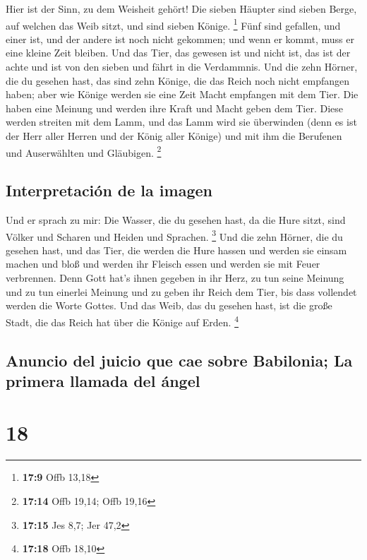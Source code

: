  Hier ist der Sinn, zu dem Weisheit gehört! Die sieben
Häupter sind sieben Berge, auf welchen das Weib sitzt, und sind sieben
Könige. \footnote{\textbf{17:9} Offb 13,18}  Fünf sind
gefallen, und einer ist, und der andere ist noch nicht gekommen; und
wenn er kommt, muss er eine kleine Zeit bleiben.  Und das
Tier, das gewesen ist und nicht ist, das ist der achte und ist von den
sieben und fährt in die Verdammnis.  Und die zehn Hörner,
die du gesehen hast, das sind zehn Könige, die das Reich noch nicht
empfangen haben; aber wie Könige werden sie eine Zeit Macht empfangen
mit dem Tier.  Die haben eine Meinung und werden ihre
Kraft und Macht geben dem Tier.  Diese werden streiten
mit dem Lamm, und das Lamm wird sie überwinden (denn es ist der Herr
aller Herren und der König aller Könige) und mit ihm die Berufenen und
Auserwählten und Gläubigen. \footnote{\textbf{17:14} Offb 19,14; Offb
  19,16}

\hypertarget{interpretaciuxf3n-de-la-imagen}{%
\subsection{Interpretación de la
imagen}\label{interpretaciuxf3n-de-la-imagen}}

 Und er sprach zu mir: Die Wasser, die du gesehen hast,
da die Hure sitzt, sind Völker und Scharen und Heiden und Sprachen.
\footnote{\textbf{17:15} Jes 8,7; Jer 47,2}  Und die zehn
Hörner, die du gesehen hast, und das Tier, die werden die Hure hassen
und werden sie einsam machen und bloß und werden ihr Fleisch essen und
werden sie mit Feuer verbrennen.  Denn Gott hat's ihnen
gegeben in ihr Herz, zu tun seine Meinung und zu tun einerlei Meinung
und zu geben ihr Reich dem Tier, bis dass vollendet werden die Worte
Gottes.  Und das Weib, das du gesehen hast, ist die große
Stadt, die das Reich hat über die Könige auf Erden. \footnote{\textbf{17:18}
  Offb 18,10}

\hypertarget{anuncio-del-juicio-que-cae-sobre-babilonia-la-primera-llamada-del-uxe1ngel}{%
\subsection{Anuncio del juicio que cae sobre Babilonia; La primera
llamada del
ángel}\label{anuncio-del-juicio-que-cae-sobre-babilonia-la-primera-llamada-del-uxe1ngel}}

\hypertarget{section-17}{%
\section{18}\label{section-17}}

